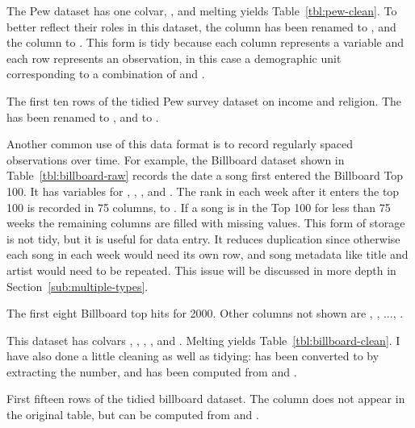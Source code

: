\documentclass[article]{jss}
\begin{document}
The Pew dataset has one colvar, , and melting yields Table~\ref{tbl:pew-clean}. To better reflect their roles in this dataset, the  column has been renamed to , and the  column to . This form is tidy because each column represents a variable and each row represents an observation, in this case a demographic unit corresponding to a combination of  and .

\begin{table}[htbp]
  \centering
  
  \caption{The first ten rows of the tidied Pew survey dataset on income and religion. The  has been renamed to , and  to .}
  \label{tbl:pew-clean}
\end{table}

Another common use of this data format is to record regularly spaced observations over time. For example, the Billboard dataset shown in Table~\ref{tbl:billboard-raw} records the date a song first entered the Billboard Top 100. It has variables for , , ,  and . The rank in each week after it enters the top 100 is recorded in 75 columns,  to . If a song is in the Top 100 for less than 75 weeks the remaining columns are filled with missing values. This form of storage is not tidy, but it is useful for data entry. It reduces duplication since otherwise each song in each week would need its own row, and song metadata like title and artist would need to be repeated. This issue will be discussed in more depth in Section~\ref{sub:multiple-types}.

\begin{table}[htbp]
  \centering
  
  \caption{The first eight Billboard top hits for 2000. Other columns not shown are , , ..., .}
  \label{tbl:billboard-raw}
\end{table}

This dataset has colvars , , , , and . Melting yields Table~\ref{tbl:billboard-clean}. I have also done a little cleaning as well as tidying:  has been converted to  by extracting the number, and  has been computed from  and .

\begin{table}[htbp]
  \centering
  
  \caption{First fifteen rows of the tidied billboard dataset. The  column does not appear in the original table, but can be computed from  and .}
  \label{tbl:billboard-clean}
\end{table}
\end{document}
